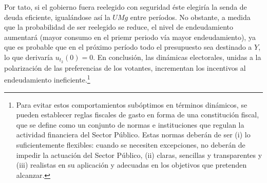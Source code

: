 \documentclass[10pt,a4paper]{article}
\begin{document}
Por tato, si el gobierno fuera reelegido con seguridad éste elegiría la senda de deuda eficiente, igualándose así la $UMg$ entre períodos. No obstante, a medida que la probabilidad de ser reelegido se reduce, el nivel de endeudamiento aumentará (mayor consumo en el priemr periodo vía mayor endeudamiento), ya que es probable que en el próximo período todo el presupuesto sea destinado a $Y$, lo que derivaría $u_{t_2}(0)=0$. En conclusión, las dinámicas electorales, unidas a la polarización de las preferencias de los votantes, incrementan los incentivos al endeudamiento ineficiente.\footnote{%
    Para evitar estos comportamientos subóptimos en términos dinámicos, se pueden establecer reglas fiscales de gasto en forma de una constitución fiscal, que se define como un conjunto de normas e instituciones que regulan la actividad financiera del Sector Público. Estas normas deberán de ser (i) lo suficientemente flexibles: cuando se necesiten excepciones, no deberán de impedir la actuación del Sector Público, (ii) claras, sencillas y transparentes y (iii) realistas en su aplicación y adecuadas en los objetivos que pretenden alcanzar.
}
\end{document}
